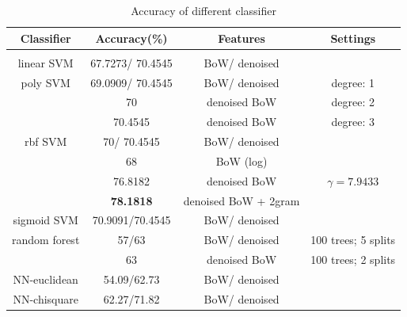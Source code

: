 \documentclass{article} %
\begin{document}
\begin{table}[t]
\caption{Accuracy of different classifier}
\begin{center}
\label{tbl:classifers}
\begin{tabular}{cccc}
\multicolumn{1}{c}{\bf Classifier }&\multicolumn{1}{c}{\bf Accuracy(\%)}  &\multicolumn{1}{c}{\bf Features} &\multicolumn{1}{c}{\bf Settings}
\\ \hline \\
linear SVM		&67.7273/ 70.4545 		&BoW/ denoised 		&  \\
poly SVM		&69.0909/ 70.4545  	&BoW/ denoised  	& degree: 1  \\
			& 70 			& denoised BoW 	& degree: 2  \\
			& 70.4545  	& denoised BoW 	& degree: 3  \\
rbf SVM       	&70/ 	70.4545  	&BoW/ denoised 		&  \\
                     	&68  			&  BoW (log) 	&  \\
          		&76.8182  		&  denoised BoW 	&  $\gamma = 7.9433$ \\
          		&{\bf 78.1818}  	&  denoised BoW + 2gram 	&    \\
sigmoid SVM     	&70.9091/70.4545	&BoW/ denoised 		&  \\
random forest    	&57/63 			& BoW/ denoised 	& 100 trees; 5 splits \\
       			&63  			& denoised BoW 	& 100 trees; 2 splits \\
NN-euclidean   	&54.09/62.73		& BoW/ denoised 	&  \\
NN-chisquare	&62.27/71.82		& BoW/ denoised 	&  \\

\end{tabular}
\end{center}
\end{table}






% 




\end{document}
